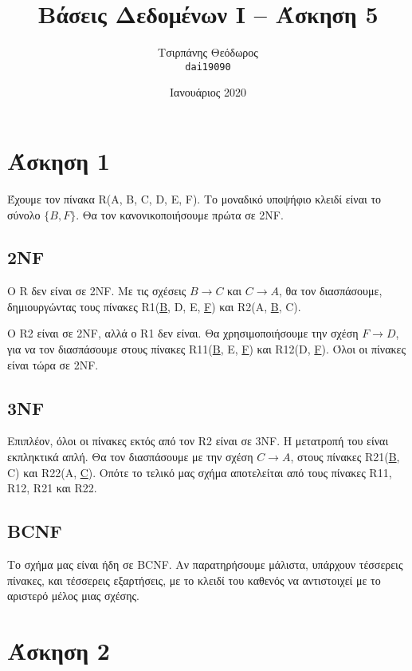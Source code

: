 \documentclass{article}
\title{Βάσεις Δεδομένων I -- Άσκηση 5}
\author{Τσιρπάνης Θεόδωρος\\ \texttt{dai19090}}
\date{Ιανουάριος 2020}
\begin{document}

\maketitle

\section*{Άσκηση 1}

Έχουμε τον πίνακα R(A, B, C, D, E, F). Το μοναδικό υποψήφιο κλειδί είναι το σύνολο $\{B, F\}$. Θα τον κανονικοποιήσουμε πρώτα σε 2NF.

\subsection*{2NF}

Ο R δεν είναι σε 2NF. Με τις σχέσεις $B \rightarrow C$ και $C \rightarrow A$, θα τον διασπάσουμε, δημιουργώντας τους πίνακες R1(\underline{B}, D, E, \underline{F}) και R2(A, \underline{B}, C).

Ο R2 είναι σε 2NF, αλλά ο R1 δεν είναι. Θα χρησιμοποιήσουμε την σχέση $F \rightarrow D$, για να τον διασπάσουμε στους πίνακες R11(\underline{B}, E, \underline{F}) και R12(D, \underline{F}). Όλοι οι πίνακες είναι τώρα σε 2NF.

\subsection*{3NF}

Επιπλέον, όλοι οι πίνακες εκτός από τον R2 είναι σε 3NF. Η μετατροπή του είναι εκπληκτικά απλή. Θα τον διασπάσουμε με την σχέση $C \rightarrow A$, στους πίνακες R21(\underline{B}, C) και R22(A, \underline{C}). Οπότε το τελικό μας σχήμα αποτελείται από τους πίνακες R11, R12, R21 και R22.

\subsection*{BCNF}

Το σχήμα μας είναι ήδη σε BCNF. Αν παρατηρήσουμε μάλιστα, υπάρχουν τέσσερεις πίνακες, και τέσσερεις εξαρτήσεις, με το κλειδί του καθενός να αντιστοιχεί με το αριστερό μέλος μιας σχέσης.

\section*{Άσκηση 2}
\end{document}
